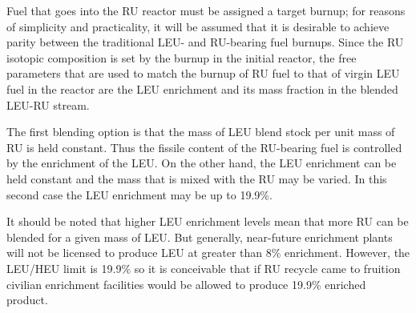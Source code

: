 Fuel that goes into the RU reactor must be assigned a target burnup; for reasons of simplicity and 
practicality, it will be assumed that it is desirable to achieve parity between the traditional LEU- and 
RU-bearing fuel burnups.  Since the RU isotopic composition is set by the burnup in the initial reactor, 
the free parameters that are used to match the burnup of RU fuel to that of virgin LEU fuel in the reactor 
are the LEU enrichment and its mass fraction in the blended LEU-RU stream.    

The first blending option is that the mass of LEU blend stock per unit mass of RU is held constant.  
Thus the fissile content of the RU-bearing fuel is controlled by the enrichment of the LEU.  On the 
other hand, the LEU enrichment can be held constant and the mass that is mixed with the RU may be 
varied.  In this second case the LEU enrichment may be up to 19.9\%.  

It should be noted that higher LEU enrichment levels mean that more RU can be blended for a given 
mass of LEU.  But generally, near-future enrichment plants will not be licensed to produce LEU at 
greater than 8\%  enrichment. However, the LEU/HEU limit is 19.9\% so it is conceivable 
that if RU recycle came to fruition civilian enrichment facilities would be allowed to produce 19.9\% 
enriched product.  



